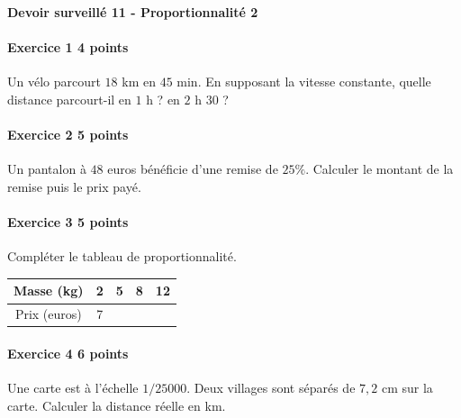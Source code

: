 \documentclass[a4paper,10pt]{article}
\newenvironment{exercice}[2]{\paragraph{Exercice #1 \hfill #2 points}\mbox{}\par}{\medskip}
\begin{document}
\begin{center}\Large\bfseries Devoir surveillé 11 - Proportionnalité 2\end{center}
\vspace{2mm}
\begin{exercice}{1}{4}Un vélo parcourt $18$ km en $45$ min. En supposant la vitesse constante, quelle distance parcourt-il en $1$ h ? en $2$ h $30$ ?\end{exercice}\begin{exercice}{2}{5}Un pantalon à $48$ euros bénéficie d'une remise de $25\%$. Calculer le montant de la remise puis le prix payé.\end{exercice}\begin{exercice}{3}{5}Compléter le tableau de proportionnalité.\begin{center}\begin{tabular}{|c|c|c|c|c|}\hline Masse (kg)&2&5&8&12\\\hline Prix (euros)&7&&&\\\hline\end{tabular}\end{center}\end{exercice}\begin{exercice}{4}{6}Une carte est à l'échelle $1/25000$. Deux villages sont séparés de $7,2$ cm sur la carte. Calculer la distance réelle en km.\end{exercice}\end{document}
\end{document}
